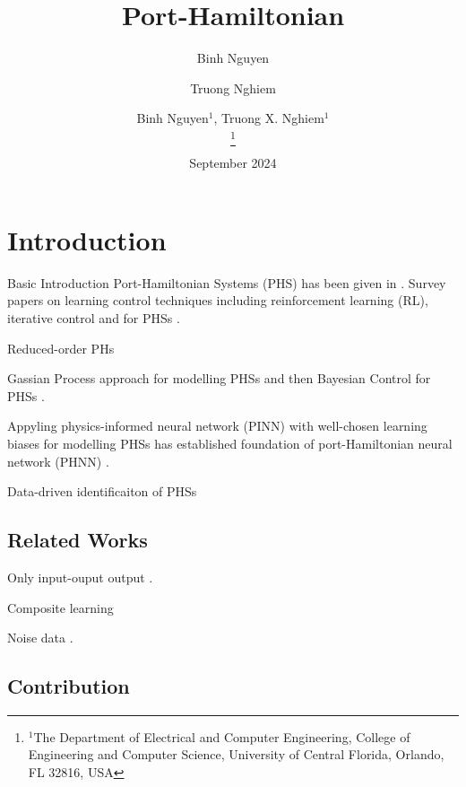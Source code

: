 \documentclass[letterpaper, 10 pt, conference]{ieeeconf}
\title{\LARGE \bf Port-Hamiltonian}
\author{Binh Nguyen$^{1}$, Truong X. Nghiem$^{1}$
\author[1]{Binh Nguyen}
\author[2]{Truong Nghiem}
\thanks{$^1$The  Department of Electrical and Computer Engineering, College of Engineering and Computer Science, University of Central Florida, Orlando, FL 32816, USA}
}
\date{September 2024}
\begin{document}
\maketitle


\begin{abstract}
\end{abstract}

\section{Introduction}

Basic Introduction Port-Hamiltonian Systems (PHS) has been given in \cite{vanderschaftPortHamiltonianSystemsIntroductory2007}. Survey papers on learning control techniques including reinforcement learning (RL), iterative control and for PHSs 
\cite{nageshraoPortHamiltonianSystemsAdaptive2016,rashadTwentyYearsDistributed2020,cherifiOverviewRecentMachine2020}. 

Reduced-order PHs \cite{wuReducedOrderLQG2021,schwerdtnerOptimizationbasedModelOrder2023}


Gassian Process approach for modelling PHSs
\cite{beckersGaussianProcessPortHamiltonian2022,beckersLearningSwitchingPortHamiltonian2023} and then Bayesian Control for PHSs \cite{beckersDataDrivenBayesianControl2023a}.

Appyling physics-informed neural network (PINN) with well-chosen learning biases for modelling PHSs has established foundation of port-Hamiltonian neural network (PHNN) \cite{nearyCompositionalLearningDynamical2023a,eidnesPseudoHamiltonianNeuralNetworks2023,desaiPortHamiltonianNeuralNetworks2021,duongPortHamiltonianNeuralODE2024}.

Data-driven identificaiton of PHSs \cite{rettbergDatadrivenIdentificationLatent2024,otterdijkLearningSubsystemDynamics2024}

\subsection{Related Works}

Only input-ouput output \cite{otterdijkLearningSubsystemDynamics2024}.

Composite learning \cite{nearyCompositionalLearningDynamical2023a,otterdijkLearningSubsystemDynamics2024}

Noise data \cite{beckersGaussianProcessPortHamiltonian2022}.

\subsection{Contribution}







\end{document}
